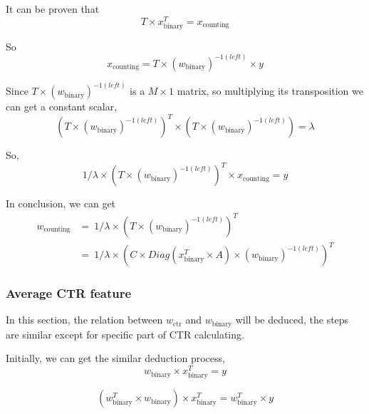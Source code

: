 \documentclass{sig-alternate}
\begin{document}
It can be proven that 
\begin{equation}
T \times x_{\text{binary}}^T =  x_{\text{counting}}
\end{equation}

So
\begin{equation}
x_{\text{counting}} =  T \times (w_{\text{binary}})^{-1(left)} \times y 
\end{equation}

Since \(T \times (w_{\text{binary}})^{-1(left)}\) is a \(M \times 1\) matrix, so multiplying its transposition we can get a constant scalar, 
\begin{equation}
(T \times (w_{\text{binary}})^{-1(left)})^T \times (T \times (w_{\text{binary}})^{-1(left)}) = \lambda
\end{equation}

So, 
\begin{equation}
1/{\lambda} \times (T \times (w_{\text{binary}})^{-1(left)})^T \times x_{\text{counting}} =  y
\end{equation}

In conclusion, we can get
\begin{equation} \label{eq:12}
\begin{split}
w_{\text{counting}} & =\ 1/{\lambda} \times (T \times (w_{\text{binary}})^{-1(left)})^T \\
& = \ 1/{\lambda} \times (C \times Diag(x_{\text{binary}}^T \times A) \times (w_{\text{binary}})^{-1(left)})^T
\end{split}
\end{equation}

\subsubsection{Average CTR feature}

\setlength{\parindent}{5ex}

In this section, the relation between  \(w_{\text{ctr}}\) and \(w_{\text{binary}}\) will be deduced, the steps are similar except for specific part of CTR calculating. \vspace{3mm}

Initially, we can get the similar deduction process, 
\begin{equation}
w_{\text{binary}} \times x_{\text{binary}}^T = y 
\end{equation}

\begin{equation}
(w_{\text{binary}}^T \times w_{\text{binary}}) \times x_{\text{binary}}^T = w_{\text{binary}}^T \times y 
\end{equation}
\end{document}
